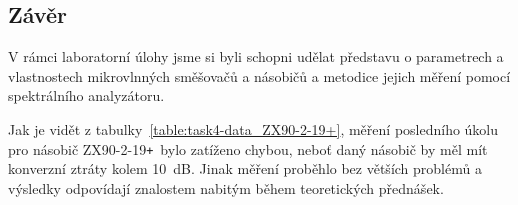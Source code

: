 \documentclass[11pt,a4paper]{article}
\newcommand{\plus}{{\texttt{+}}}
\begin{document}
\subsection*{Závěr}
V rámci laboratorní úlohy jsme si byli schopni udělat představu o parametrech a vlastnostech mikrovlnných směšovačů a násobičů a metodice jejich měření pomocí spektrálního analyzátoru.

Jak je vidět z tabulky~\ref{table:task4-data_ZX90-2-19+}, měření posledního úkolu pro násobič ZX90-2-19\plus~bylo zatíženo chybou, neboť daný násobič by měl mít konverzní ztráty kolem 10~dB. Jinak měření proběhlo bez větších problémů a výsledky odpovídají znalostem nabitým během teoretických přednášek.
\end{document}
